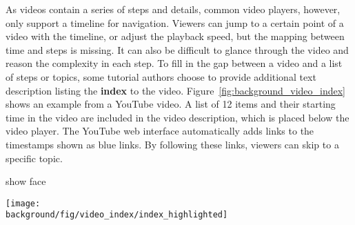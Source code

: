 As videos contain a series of steps and details, common video players, however, only support a timeline for navigation. Viewers can jump to a certain point of a video with the timeline, or adjust the playback speed, but the mapping between time and steps is missing. It can also be difficult to glance through the video and reason the complexity in each step.
%
To fill in the gap between a video and a list of steps or topics, some tutorial authors choose to provide additional text description listing the \textbf{index} to the video. Figure~\ref{fig:background_video_index} shows an example from a YouTube video. A list of 12 items and their starting time in the video are included in the video description, which is placed below the video player. The YouTube web interface automatically adds links to the timestamps shown as blue links. By following these links, viewers can skip to a specific topic.

show face~\cite{Kizilcec:2014:SFV:2556288.2557207}

\begin{figure*}[h!]
  \centering
  \texttt{[image: \\background/fig/video\_index/index\_highlighted]}
  \begin{minipage}{\textwidth}
  \caption[Example video index to video instructions provided by authors for viewers to navigate between topics.]{
    Example video index to video instructions\footnote{Mountain Buggy, Urban Jungle ™ Stroller Instructions, \url{https://youtu.be/QwCtdpDmYu8}} provided by authors for viewers to navigate between topics.
  }
  \label{fig:background_video_index}
  \end{minipage}
\end{figure*}










